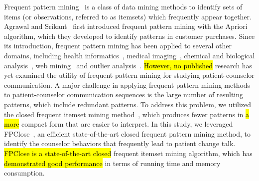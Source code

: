 \documentclass[smallextended]{svjour3}       %
\begin{document}
Frequent pattern mining~\cite{aggarwal2014frequent} is a class of data mining methods to identify sets of items (or observations, referred to as itemsets) which frequently appear together. Agrawal and Srikant~\cite{agrawal1994fast} first introduced frequent pattern mining with the Apriori algorithm, which they developed to identify patterns in customer purchases. Since its introduction, frequent pattern mining has been applied to several other domains, including health informatics~\cite{abdullah2008analysis, olukunle2002fast, bethel2006mining, wright2015use}, medical imaging~\cite{olukunle2002fast}, chemical and biological analysis~\cite{deshpande2005frequent, leach2007introduction, zhang2008discovering}, web mining~\cite{srivastava2000web} and outlier analysis~\cite{aggarwal2015outlier}. \hl{However, no published} research has yet examined the utility of frequent pattern mining for studying patient-counselor communication. A major challenge in applying frequent pattern mining methods to patient-counselor communication sequences is the large number of resulting patterns, which include redundant patterns. To address this problem, we utilized the closed frequent itemset mining method~\cite{pasquier1999discovering}, which produces fewer patterns in \hl{a more} compact form that are easier to interpret. In this study, we leveraged FPClose~\cite{grahne2005fast}, an efficient state-of-the-art closed frequent pattern mining method, to identify the counselor behaviors that frequently lead to patient change talk. \hl{FPClose is a state-of-the-art closed} frequent itemset mining algorithm, which has \hl{demonstrated good performance} in terms of running time and memory consumption.
\end{document}

